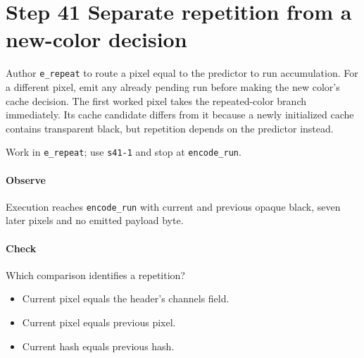 \section{Step 41 Separate repetition from a new-color decision}\label{qoi-s41}
Author \texttt{e\_repeat} to route a pixel equal to the predictor to run accumulation. For a different pixel, emit any already pending run before making the new color’s cache decision. The first worked pixel takes the repeated-color branch immediately. Its cache candidate differs from it because a newly initialized cache contains transparent black, but repetition depends on the predictor instead.

Work in \texttt{e\_repeat}; use \texttt{s41-1} and stop at \texttt{encode\_run}.

\paragraph{Observe} Execution reaches \texttt{encode\_run} with current and previous opaque black, seven later pixels and no emitted payload byte.

\paragraph{Check} Which comparison identifies a repetition?
\begin{itemize}
  \item[A.] Current pixel equals the header’s channels field.
  \item[B.] Current pixel equals previous pixel.
  \item[C.] Current hash equals previous hash.
\end{itemize}
